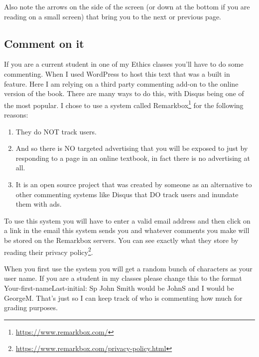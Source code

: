 \documentclass[]{book}
\providecommand{\tightlist}{%
  \setlength{\itemsep}{0pt}\setlength{\parskip}{0pt}}
\renewcommand{\href}[2]{#2\footnote{\url{#1}}}
\begin{document}
Also note the arrows on the side of the screen (or down at the bottom if you are reading on a small screen) that bring you to the next or previous page.

\hypertarget{comment-on-it}{%
\subsection*{Comment on it}\label{comment-on-it}}


If you are a current student in one of my Ethics classes you'll have to do some commenting. When I used WordPress to host this text that was a built in feature. Here I am relying on a third party commenting add-on to the online version of the book. There are many ways to do this, with Disqus being one of the most popular. I chose to use a system called \href{https://www.remarkbox.com/}{Remarkbox} for the following reasons:

\begin{enumerate}
\def\labelenumi{\arabic{enumi}.}
\tightlist
\item
  They do NOT track users.
\item
  And so there is NO targeted advertising that you will be exposed to just by responding to a page in an online textbook, in fact there is no advertising at all.
\item
  It is an open source project that was created by someone as an alternative to other commenting systems like Disqus that DO track users and inundate them with ads.
\end{enumerate}

To use this system you will have to enter a valid email address and then click on a link in the email this system sends you and whatever comments you make will be stored on the Remarkbox servers. You can see exactly what they store by reading their \href{https://www.remarkbox.com/privacy-policy.html}{privacy policy}.

When you first use the system you will get a random bunch of characters as your user name. If you are a student in my classes please change this to the format Your-first-nameLast-initial: Sp John Smith would be JohnS and I would be GeorgeM. That's just so I can keep track of who is commenting how much for grading purposes.
\end{document}
